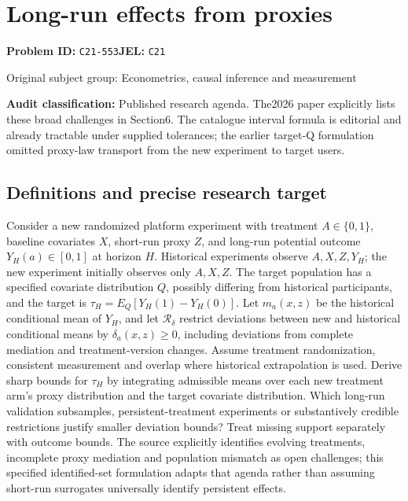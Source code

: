 \documentclass[11pt,a4paper]{article}
\begin{document}
\section*{Long-run effects from proxies}
\textbf{Problem ID:} \texttt{C21-553}\quad \textbf{JEL:} \texttt{C21}\par
\label{problem:OP-0429}
{\sffamily\small\color{muted}Original subject group: Econometrics, causal inference and measurement\par}
\label{definitions:problem:30007711}
\textbf{Audit classification:} Published research agenda. The2026 paper explicitly lists these broad challenges in Section6. The catalogue interval formula is editorial and already tractable under supplied tolerances; the earlier target-Q formulation omitted proxy-law transport from the new experiment to target users.
\subsection*{Definitions and precise research target}
Consider a new randomized platform experiment with treatment \(A\in\{0,1\}\), baseline covariates \(X\), short-run proxy \(Z\), and long-run potential outcome \(Y_H(a)\in[0,1]\) at horizon \(H\). Historical experiments observe \(A,X,Z,Y_H\); the new experiment initially observes only \(A,X,Z\). The target population has a specified covariate distribution \(Q\), possibly differing from historical participants, and the target is \(\tau_H=E_Q[Y_H(1)-Y_H(0)]\). Let \(m_a(x,z)\) be the historical conditional mean of \(Y_H\), and let \(\mathcal R_\delta\) restrict deviations between new and historical conditional means by \(\delta_a(x,z)\geq0\), including deviations from complete mediation and treatment-version changes. Assume treatment randomization, consistent measurement and overlap where historical extrapolation is used. Derive sharp bounds for \(\tau_H\) by integrating admissible means over each new treatment arm's proxy distribution and the target covariate distribution. Which long-run validation subsamples, persistent-treatment experiments or substantively credible restrictions justify smaller deviation bounds? Treat missing support separately with outcome bounds. The source explicitly identifies evolving treatments, incomplete proxy mediation and population mismatch as open challenges; this specified identified-set formulation adapts that agenda rather than assuming short-run surrogates universally identify persistent effects.
\end{document}

